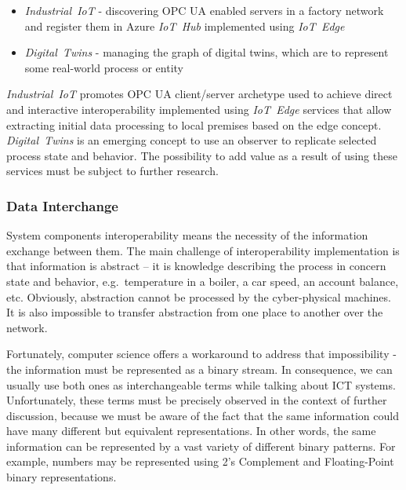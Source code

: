 \documentclass{jacsart}
\begin{document}
\begin{itemize}
      \item \textit{Industrial\ IoT} - discovering OPC UA enabled servers in a factory network and register them in Azure \textit{IoT\ Hub} implemented using \textit{IoT\ Edge}
      \item \textit{Digital\ Twins} - managing the graph of digital twins, which are to represent some real-world process or entity
\end{itemize}

\textit{Industrial\ IoT} promotes OPC UA client/server archetype used to
achieve direct and interactive interoperability implemented using
\textit{IoT\ Edge} services that allow extracting initial data
processing to local premises based on the edge concept.
\textit{Digital\ Twins} is an emerging concept to use an observer to
replicate selected process state and behavior. The possibility to add
value as a result of using these services must be subject to further
research.

\subsubsection{Data Interchange}\label{data-interchange}

System components interoperability means the necessity of the
information exchange between them. The main challenge of
interoperability implementation is that information is abstract -- it is
knowledge describing the process in concern state and behavior,
e.g.~temperature in a boiler, a car speed, an account balance, etc.
Obviously, abstraction cannot be processed by the cyber-physical
machines. It is also impossible to transfer abstraction from one place
to another over the network.

Fortunately, computer science offers a workaround to address that
impossibility - the information must be represented as a binary stream.
In consequence, we can usually use both ones as interchangeable terms
while talking about ICT systems. Unfortunately, these terms must be
precisely observed in the context of further discussion, because we must
be aware of the fact that the same information could have many different
but equivalent representations. In other words, the same information can
be represented by a vast variety of different binary patterns. For
example, numbers may be represented using 2's Complement and
Floating-Point binary representations.
\end{document}
